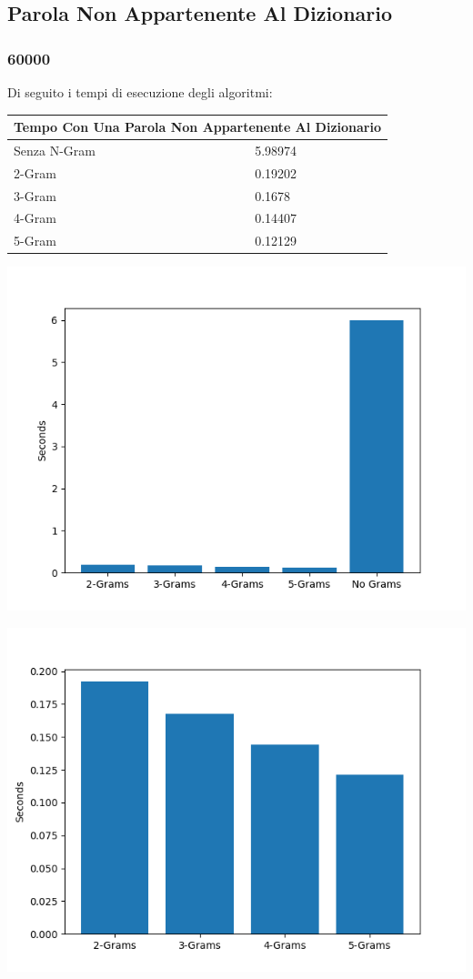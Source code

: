 \documentclass{article}
\begin{document}
\subsection{Parola Non Appartenente Al Dizionario}
\subsubsection{60000}
Di seguito i tempi di esecuzione degli algoritmi:
\medskip

\begin{tabular}{ |p{3cm}||p{3.5cm}|  }
 \hline
 \multicolumn{2}{|c|}{Tempo Con Una Parola Non Appartenente Al Dizionario} \\
\hline
 Senza N-Gram  &   5.98974\\
 \hline
 2-Gram &  0.19202    \\\hline
 3-Gram & 0.1678 \\\hline
 4-Gram & 0.14407\\\hline
 5-Gram & 0.12129  \\
 \hline
\end{tabular}


\includegraphics[scale=0.5]{img/ParolaNonAppartenente60000_parole.png}

\includegraphics[scale=0.5]{img/ParolaNonAppartenenteSoloGram60000_parole.png}
\end{document}
